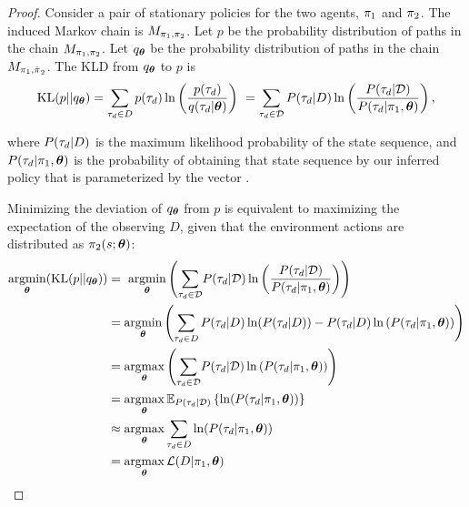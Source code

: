     \begin{proof}
        Consider a pair of stationary policies for the two agents, $\pi_{1}$ and $\pi_{2}$. The induced Markov
        chain is $M_{\pi_{1}, \pi_{2}}$. Let $p$ be the probability distribution of paths in the chain
        $M_{\pi_{1}, \pi_{2}}$. Let $q_{\boldsymbol{\mathbb{\theta}}}$ be the probability distribution of paths in the chain
        $M_{\pi_{1}, \hat{\pi_{}}_2}$. The \ac{KLD} from $q_{\boldsymbol{\mathbb{\theta}}}$ to $p$ is
        \begin{equation*}\label{eq:traj_kl_div}
            \text{KL}(p || q_{\boldsymbol{\mathbb{\theta}}}) = \sum_{\tau_d \in D} p(\tau_d) \ln \left( \frac{p(\tau_d)}
                                                {q(\tau_d|\boldsymbol{\mathbb{\theta}})} \right)\
                = \sum_{\tau_d \in \mathcal{D}} P(\tau_d|D) \ln \left( \frac{P(\tau_d|\mathcal{D})}
                                                {P(\tau_d|\pi_{1},\boldsymbol{\mathbb{\theta}})} \right),
        \end{equation*}

        \noindent
        where $P(\tau_d|D)$ is the maximum likelihood probability of the state sequence, and
        $P(\tau_d|\pi_{1},\boldsymbol{\mathbb{\theta}})$ is the probability of obtaining that state sequence by our inferred policy
        that is parameterized by the vector \paramVec.

        Minimizing the deviation of $q_{\boldsymbol{\mathbb{\theta}}}$ from $p$ is equivalent to maximizing the expectation of the
        observing $D$, given that the environment actions are distributed as $\pi_{2}(s; \boldsymbol{\mathbb{\theta}})$:
        \begin{equation}\label{eq:min_kld}
            \begin{aligned}
                \mathop{\mathrm{argmin}}_{\boldsymbol{\mathbb{\theta}}}(\text{KL}(p || q_{\boldsymbol{\mathbb{\theta}}})) & = \
                    \mathop{\mathrm{argmin}}_{\boldsymbol{\mathbb{\theta}}}\left(\sum_{\tau_d \in  \mathcal{D}}\!  P(\tau_d|\mathcal{D})
                    \ln\left(\frac{P(\tau_d|\mathcal{D})}{P(\tau_d|\pi_{1},\boldsymbol{\mathbb{\theta}})}\right)\right)\\
                & = \mathop{\mathrm{argmin}}_{\boldsymbol{\mathbb{\theta}}}\left(\sum_{\tau_d \in D} P(\tau_d|D) \ln(P(\tau_d|D)) -
                    P(\tau_d|D) \ln\left(P(\tau_d|\pi_{1},\boldsymbol{\mathbb{\theta}})\right)\right)\\
                & = \mathop{\mathrm{argmax}}_{\boldsymbol{\mathbb{\theta}}}\left(\sum_{\tau_d \in \mathcal{D}}\!  P(\tau_d|\mathcal{D})
                    \ln\left(P(\tau_d|\pi_{1},\boldsymbol{\mathbb{\theta}})\right)\right)\\
                & = \mathop{\mathrm{argmax}}_{\boldsymbol{\mathbb{\theta}}}\mathbb{E}_{P(\tau_d|\mathcal{D})}\left\{\ln(P(\tau_d|\pi_{1},\boldsymbol{\mathbb{\theta}}))\right\} \\
                &\approx \mathop{\mathrm{argmax}}_{\boldsymbol{\mathbb{\theta}}} \sum_{\tau_d \in D}  \ln(P(\tau_d|\pi_{1},\boldsymbol{\mathbb{\theta}}))\\
                & =\mathop{\mathrm{argmax}}_{\boldsymbol{\mathbb{\theta}}} \mathcal{L}(D|\pi_{1},\boldsymbol{\mathbb{\theta}})
            \end{aligned}
        \end{equation}


\end{proof}
